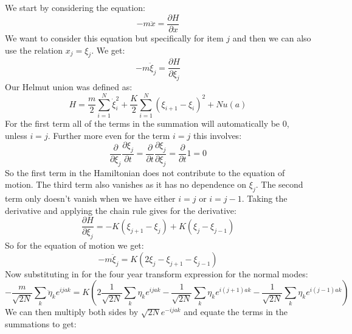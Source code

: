 \documentclass[12pt]{article}
\begin{document}
\subsection{}
We start by considering the equation:
\begin{equation}
  -m  \ddot{x}= \frac{\partial H}{\partial x}
\end{equation}
We want to consider this equation but specifically for item $j$ and then we can also use the relation $x_j = \xi_j$. We get:
\begin{equation}
  -m  \ddot{\xi}_{j}= \frac{\partial H}{\partial \xi_{j}}
\end{equation}
Our Helmut union was defined as:
\begin{equation}
  H=\frac{m}{2} \sum_{i=1}^{N} \dot{\xi}_{i}^{2}+\frac{K}{2} \sum_{i=1}^{N}\left(\xi_{i+1}-\xi_{i}\right)^{2}+N u(a)
\end{equation}
For the first term all of the terms in the summation will automatically be 0, unless $i=j$. Further more even for the term $i=j$ this involves:
\begin{equation}
  \frac{\partial }{\partial \xi_{j}}\frac{\partial \xi_{j}}{\partial t} = \frac{\partial }{\partial t}\frac{\partial \xi_{j}}{\partial \xi_{j}} = \frac{\partial }{\partial t}1 = 0
\end{equation}
So the first term in the Hamiltonian does not contribute to the equation of motion. The third term also vanishes as it has no dependence on $\xi_j$. The second term only doesn't vanish when we have either $i=j$ or $i=j-1$. Taking the derivative and applying the chain rule gives for the derivative:
\begin{equation}
  \frac{\partial H}{\partial \xi_{j}} = -K\left(\xi_{j+1}-\xi_{j}\right) + K\left(\xi_{j}-\xi_{j-1}\right)
\end{equation}
So for the equation of motion we get:
\begin{equation}
  -m  \ddot{\xi}_{j}= K(2 \xi_{j}-\xi_{j+1}-\xi_{j-1})
\end{equation}
Now substituting in for the four year transform expression for the normal modes:
\begin{equation}
  -\frac{m}{\sqrt{2N}} \sum_{k} \ddot{\eta}_{k} e^{i j a k}= K(2 \frac{1}{\sqrt{2N}} \sum_{k} \eta_{k} e^{i j a k}-\frac{1}{\sqrt{2N}} \sum_{k} \eta_{k} e^{i (j+1) a k}-\frac{1}{\sqrt{2N}} \sum_{k} \eta_{k} e^{i (j-1) a k})
\end{equation}
We can then multiply both sides by $\sqrt{2N} e^{-i j a k}$ and equate the terms in the summations to get:
\end{document}
